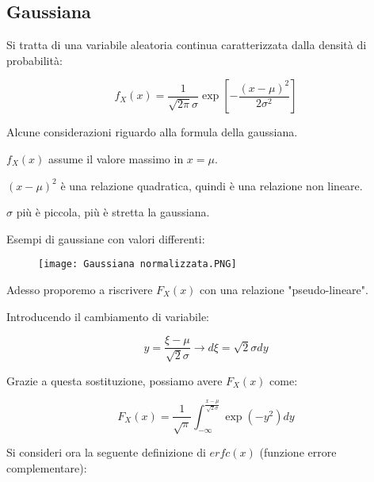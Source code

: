 \subsection{Gaussiana} 

Si tratta di una variabile aleatoria continua caratterizzata dalla densità di probabilità: 

{
    \Large 
    \begin{equation}
        f_X (x) 
        = 
        \frac{1}{\sqrt{2 \pi} \sigma} 
        \exp[- \frac{(x - \mu)^{2}}{2 \sigma ^{2}}]
    \end{equation}
}

Alcune considerazioni riguardo alla formula della gaussiana. \newline 

$f_X (x)$ assume il valore massimo in $x = \mu$. \newline 

$(x- \mu)^{2}$ è una relazione quadratica, quindi è una relazione non lineare. \newline 

$\sigma$ più è piccola, più è stretta la gaussiana. \newline 

Esempi di gaussiane con valori differenti: 

\begin{figure}[h]
    \centering
    \texttt{[image: Gaussiana normalizzata.PNG]}
\end{figure} 

Adesso proporemo a riscrivere $F_X (x)$ con una relazione "pseudo-lineare". \newline 

Introducendo il cambiamento di variabile: 

{
    \Large 
    \begin{equation}
        y = \frac{\xi - \mu}{\sqrt{2} \sigma} 
        \rightarrow 
        d\xi = \sqrt{2} \sigma dy
    \end{equation}
}

Grazie a questa sostituzione, possiamo avere $F_X (x)$ come: 

{
    \Large 
    \begin{equation}
        F_X (x) 
        = 
        \frac{1}{\sqrt{\pi}} 
        \int_{-\infty}^{\frac{x - \mu}{\sqrt{2} \sigma}} 
        \exp(-y^{2}) dy
    \end{equation}
} 

Si consideri ora la seguente definizione di $erfc(x)$ (funzione errore complementare): 

